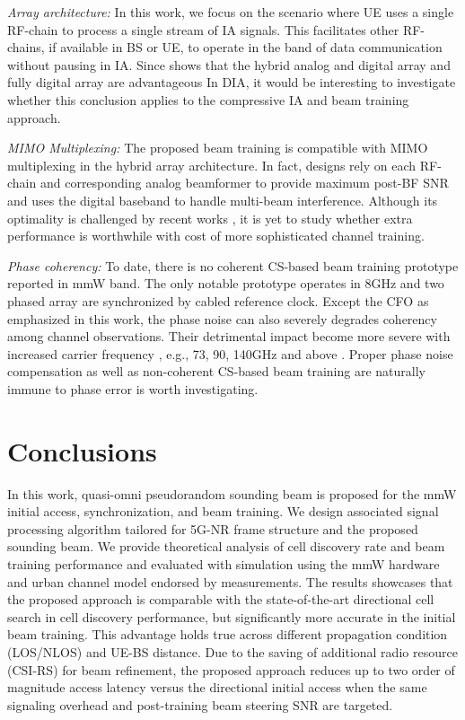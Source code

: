 \documentclass[journal]{IEEEtran}
\begin{document}
\textit{Array architecture:} In this work, we focus on the scenario where UE uses a single RF-chain to process a single stream of IA signals. This facilitates other RF-chains, if available in BS or UE, to operate in the band of data communication without pausing in IA. Since \cite{7161389} shows that the hybrid analog and digital array and fully digital array are advantageous In DIA, it would be interesting to investigate whether this conclusion applies to the compressive IA and beam training approach. 

\textit{MIMO Multiplexing:} The proposed beam training is compatible with MIMO multiplexing in the hybrid array architecture. In fact, designs \cite{7160780,7914742} rely on each RF-chain and corresponding analog beamformer to provide maximum post-BF SNR and uses the digital baseband to handle multi-beam interference. Although its optimality is challenged by recent works \cite{8323164}, it is yet to study whether extra performance is worthwhile with cost of more sophisticated channel training.

\textit{Phase coherency:} To date, there is no coherent CS-based beam training prototype reported in mmW band. The only notable prototype \cite{7146023} operates in 8GHz and two phased array are synchronized by cabled reference clock. Except the CFO as emphasized in this work, the phase noise can also severely degrades coherency among channel observations. Their detrimental impact become more severe with increased carrier frequency , e.g., 73, 90, 140GHz and above \cite{DBLP_1811_03269}. Proper phase noise compensation as well as non-coherent CS-based beam training \cite{Rasekh_noncoherentCS_ACM_2017,UCSB_noncoherentCS_arxiv_1801,Hassanieh:2018:FMW:3230543.3230581} are naturally immune to phase error is worth investigating.






%  
%
\section{Conclusions}
\label{sec:Conclusion}
In this work, quasi-omni pseudorandom sounding beam is proposed for the mmW initial access, synchronization, and beam training. We design associated signal processing algorithm tailored for 5G-NR frame structure and the proposed sounding beam. We provide theoretical analysis of cell discovery rate and beam training performance and evaluated with simulation using the mmW hardware and urban channel model endorsed by measurements. The results showcases that the proposed approach is comparable with the state-of-the-art directional cell search in cell discovery performance, but significantly more accurate in the initial beam training. This advantage holds true across different propagation condition (LOS/NLOS) and UE-BS distance. Due to the saving of additional radio resource (CSI-RS) for beam refinement, the proposed approach reduces up to two order of magnitude access latency versus the directional initial access when the same signaling overhead and post-training beam steering SNR are targeted.
\end{document}
